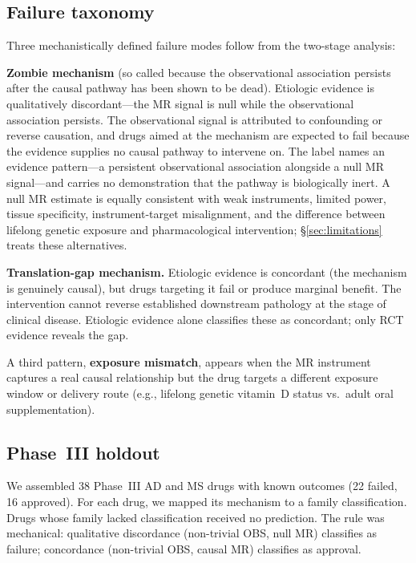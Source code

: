 \documentclass[11pt]{article}
\begin{document}
\subsection{Failure taxonomy}

Three mechanistically defined failure modes follow from the two-stage analysis:

\textbf{Zombie mechanism} (so called because the observational association persists after the causal pathway has been shown to be dead). Etiologic evidence is qualitatively discordant---the MR signal is null while the observational association persists. The observational signal is attributed to confounding or reverse causation, and drugs aimed at the mechanism are expected to fail because the evidence supplies no causal pathway to intervene on. The label names an evidence pattern---a persistent observational association alongside a null MR signal---and carries no demonstration that the pathway is biologically inert. A null MR estimate is equally consistent with weak instruments, limited power, tissue specificity, instrument-target misalignment, and the difference between lifelong genetic exposure and pharmacological intervention; \S\ref{sec:limitations} treats these alternatives.

\textbf{Translation-gap mechanism.} Etiologic evidence is concordant (the mechanism is genuinely causal), but drugs targeting it fail or produce marginal benefit. The intervention cannot reverse established downstream pathology at the stage of clinical disease. Etiologic evidence alone classifies these as concordant; only RCT evidence reveals the gap.

A third pattern, \textbf{exposure mismatch}, appears when the MR instrument captures a real causal relationship but the drug targets a different exposure window or delivery route (e.g., lifelong genetic vitamin~D status vs.\ adult oral supplementation).

\subsection{Phase~III holdout}

We assembled 38 Phase~III AD and MS drugs with known outcomes (22 failed, 16 approved). For each drug, we mapped its mechanism to a family classification. Drugs whose family lacked classification received no prediction. The rule was mechanical: qualitative discordance (non-trivial OBS, null MR) classifies as failure; concordance (non-trivial OBS, causal MR) classifies as approval.
\end{document}
